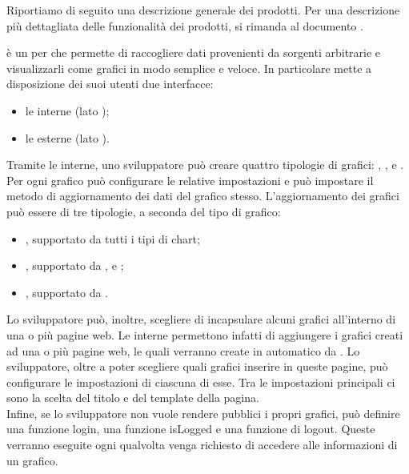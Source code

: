    Riportiamo di seguito una descrizione generale dei prodotti. Per una descrizione più dettagliata delle funzionalità dei prodotti, si rimanda al documento .

         è un  per  che permette di raccogliere dati provenienti da sorgenti arbitrarie e visualizzarli come grafici in modo semplice e veloce. In particolare mette a disposizione dei suoi utenti due interfacce:
        \begin{itemize}
            \item le  interne (lato );
            \item le  esterne (lato ).
        \end{itemize}
        
        Tramite le  interne, uno sviluppatore può creare quattro tipologie di grafici: , ,  e . Per ogni grafico può configurare le relative impostazioni e può impostare il metodo di aggiornamento dei dati del grafico stesso. L'aggiornamento dei grafici può essere di tre tipologie, a seconda del tipo di grafico:
        \begin{itemize}
            \item {}, supportato da tutti i tipi di chart;
            \item {}, supportato da ,  e ;
            \item {}, supportato da .
        \end{itemize}
        
        Lo sviluppatore può, inoltre, scegliere di incapsulare alcuni grafici all'interno di una o più pagine web. Le  interne permettono infatti di aggiungere i grafici creati ad una o più pagine web, le quali verranno create in automatico da . Lo sviluppatore, oltre a poter scegliere quali grafici inserire in queste pagine, può configurare le impostazioni di ciascuna di esse. Tra le impostazioni principali ci sono la scelta del titolo e del template della pagina.\\
        Infine, se lo sviluppatore non vuole rendere pubblici i propri grafici, può definire una funzione login, una funzione isLogged e una funzione di logout. Queste verranno eseguite ogni qualvolta venga richiesto di accedere alle informazioni di un grafico.
       
